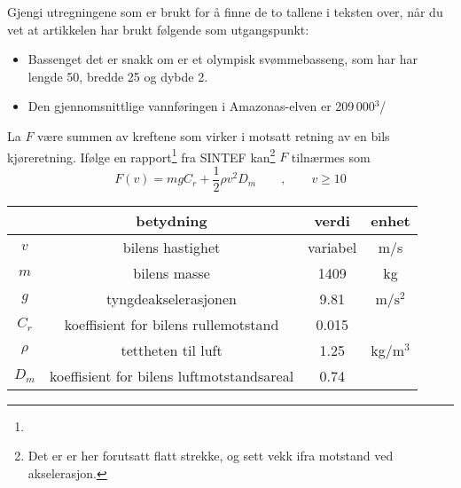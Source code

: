 Gjengi utregningene som er brukt for å finne de to tallene i teksten over, når du vet at artikkelen har brukt følgende som utgangspunkt:
\begin{itemize}
\item Bassenget det er snakk om er et olympisk svømmebasseng, som har har lengde 50, bredde 25 og dybde 2.
\item Den gjennomsnittlige vannføringen i Amazonas-elven er 209\,000$ ^3 $/
\end{itemize}
\newpage
{}

La $ F $ være summen av kreftene som virker i motsatt retning av en bils kjøreretning. Ifølge en rapport\footnote{} fra SINTEF kan\footnote{Det er er her forutsatt flatt strekke, og sett vekk ifra motstand ved akselerasjon.} $ F $ tilnærmes som
\[ F(v)= mgC_r+\frac{1}{2}\rho v^2 D_m\qquad,\qquad v\geq10\]
\begin{center}
	\begin{tabular}{c|c|c|c}
		& \textbf{betydning} & \textbf{verdi}&\textbf{enhet}  \\ \hline
		$ v $ & bilens hastighet & variabel& m/s \\
		$ m $& bilens masse\footnotemark & 1409 & kg\\
		$ g $& tyngdeakselerasjonen & 9.81 & m/$ \text{s}^2 $ \\
		$ C_r $ & koeffisient for bilens rullemotstand & 0.015\\
		$ \rho $ & tettheten til luft & 1.25 & kg/$ \text{m}^3 $ \\
		$ D_m $& koeffisient for bilens luftmotstandsareal\footnotemark &0.74
	\end{tabular}
\end{center}


